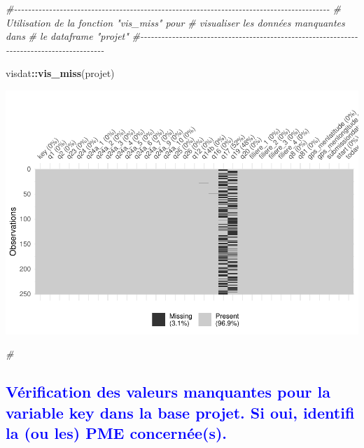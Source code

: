 \documentclass[
]{article}
\newenvironment{Shaded}{\begin{snugshade}}{\end{snugshade}}
\newcommand{\CommentTok}[1]{\textcolor[rgb]{0.56,0.35,0.01}{\textit{#1}}}
\newcommand{\FunctionTok}[1]{\textcolor[rgb]{0.13,0.29,0.53}{\textbf{#1}}}
\newcommand{\NormalTok}[1]{#1}
\newcommand{\SpecialCharTok}[1]{\textcolor[rgb]{0.81,0.36,0.00}{\textbf{#1}}}
\begin{document}
\begin{Shaded}
\begin{Highlighting}[]
\CommentTok{\#{-}{-}{-}{-}{-}{-}{-}{-}{-}{-}{-}{-}{-}{-}{-}{-}{-}{-}{-}{-}{-}{-}{-}{-}{-}{-}{-}{-}{-}{-}{-}{-}{-}{-}{-}{-}{-}{-}{-}{-}{-}{-}{-}{-}{-}{-}{-}{-}{-}{-}{-}{-}{-}{-}{-}{-}{-}{-}{-}{-}{-}{-}{-}{-}{-}{-}{-}{-}{-}{-}{-}{-}{-}{-}{-}{-}{-}{-}{-}{-}{-}{-}{-}{-}{-}{-}{-}{-}{-}{-}}
\CommentTok{\#       Utilisation de la fonction "vis\_miss" pour            }
\CommentTok{\#         visualiser les données manquantes dans              }
\CommentTok{\#             le dataframe "projet"                           }
\CommentTok{\#{-}{-}{-}{-}{-}{-}{-}{-}{-}{-}{-}{-}{-}{-}{-}{-}{-}{-}{-}{-}{-}{-}{-}{-}{-}{-}{-}{-}{-}{-}{-}{-}{-}{-}{-}{-}{-}{-}{-}{-}{-}{-}{-}{-}{-}{-}{-}{-}{-}{-}{-}{-}{-}{-}{-}{-}{-}{-}{-}{-}{-}{-}{-}{-}{-}{-}{-}{-}{-}{-}{-}{-}{-}{-}{-}{-}{-}{-}{-}{-}{-}{-}{-}{-}{-}{-}{-}{-}{-}{-}}
 

\NormalTok{visdat}\SpecialCharTok{::}\FunctionTok{vis\_miss}\NormalTok{(projet)}
\end{Highlighting}
\end{Shaded}

\includegraphics{PROJET_files/figure-latex/unnamed-chunk-5-1.pdf}

\begin{Shaded}
\begin{Highlighting}[]
\CommentTok{\#}
\end{Highlighting}
\end{Shaded}

\newpage

\textcolor{blue}{\subsection{Vérification des valeurs manquantes pour la variable key dans la base projet. Si oui, identifi la (ou les)
PME concernée(s).}}
\end{document}
